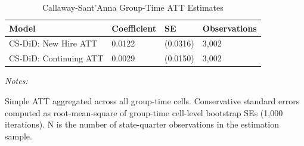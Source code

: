 \begin{table}[!h]
\centering
\caption{\label{tab:csatt}Callaway-Sant'Anna Group-Time ATT Estimates}
\centering
\begin{threeparttable}
\begin{tabular}[t]{llll}
\toprule
Model & Coefficient & SE & Observations\\
\midrule
CS-DiD: New Hire ATT & 0.0122 & (0.0316) & 3,002\\
CS-DiD: Continuing ATT & 0.0029 & (0.0150) & 3,002\\
\bottomrule
\end{tabular}
\begin{tablenotes}[para]
\item \textit{Notes:} 
\item Simple ATT aggregated across all group-time cells. Conservative standard errors computed as root-mean-square of group-time cell-level bootstrap SEs (1,000 iterations). N is the number of state-quarter observations in the estimation sample.
\end{tablenotes}
\end{threeparttable}
\end{table}
